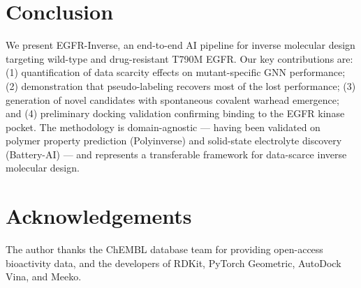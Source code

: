 \documentclass[11pt]{article}
\begin{document}
\section{Conclusion}

We present EGFR-Inverse, an end-to-end AI pipeline for inverse molecular design
targeting wild-type and drug-resistant T790M EGFR.
Our key contributions are:
(1) quantification of data scarcity effects on mutant-specific GNN performance;
(2) demonstration that pseudo-labeling recovers most of the lost performance;
(3) generation of novel candidates with spontaneous covalent warhead emergence;
and (4) preliminary docking validation confirming binding to the EGFR kinase pocket.
The methodology is domain-agnostic --- having been validated on polymer property
prediction (Polyinverse) and solid-state electrolyte discovery (Battery-AI) ---
and represents a transferable framework for data-scarce inverse molecular design.

\section*{Acknowledgements}
The author thanks the ChEMBL database team for providing open-access bioactivity
data, and the developers of RDKit, PyTorch Geometric, AutoDock Vina, and Meeko.
\end{document}
